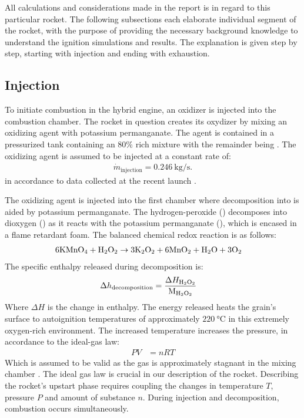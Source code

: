 	All calculations and considerations made in the report is in regard to this particular rocket. The following subsections each elaborate individual segment of the rocket, with the purpose of providing the necessary background knowledge to understand the ignition simulations and results. The explanation is given step by step, starting with injection and ending with exhaustion.


\subsection{Injection}

	To initiate combustion in the hybrid engine, an oxidizer is injected into the combustion chamber. The rocket in question creates its oxydizer by mixing an oxidizing agent with potassium permanganate. The agent is contained in a pressurized tank containing an $80 \%$  rich mixture with the remainder being . The oxidizing agent is assumed to be injected at a constant rate of:
		\begin{align}
			\dot{m}_\text{injection} = \SI{0.246}{\kg\per\s}.
		\end{align}
	in accordance to data collected at the recent launch \cite{Alex2015rapport}.

	The oxidizing agent is injected into the first chamber where decomposition into  is aided by potassium permanganate. The hydrogen-peroxide () decomposes into dioxygen () as it reacts with the potassium permanganate (), which is encased in a flame retardant foam. The balanced chemical redox reaction is as follows:
		\begin{align}
			\mathrm{6 KMnO_4 + H_2O_2} &\rightarrow \mathrm{3 K_2O_2 + 6 MnO_2 + H_2O + 3 O_2}
		\end{align}
	The specific enthalpy released during decomposition is:
		\begin{align}
			\Delta h_\text{decomposition} &= \frac{\Delta H_{\mathrm{H_2O_2}}}{\text{M}_{\mathrm{H_2O_2}}}
		\end{align}
	Where $\Delta H$ is the change in enthalpy. The energy released heats the grain's surface to autoignition temperatures of approximately $\SI{220}{\celsius}$ in this extremely oxygen-rich environment. The increased temperature increases the pressure, in accordance to the ideal-gas law:
		\begin{align}
			P V &= n R T
		\end{align}
	Which is assumed to be valid as the gas is approximately stagnant in the mixing chamber \cite{atkins}.
	The ideal gas law is crucial in our description of the rocket. Describing the rocket's upstart phase requires coupling the changes in temperature $T$, pressure $P$ and amount of substance $n$. During injection and decomposition, combustion occurs simultaneously.

